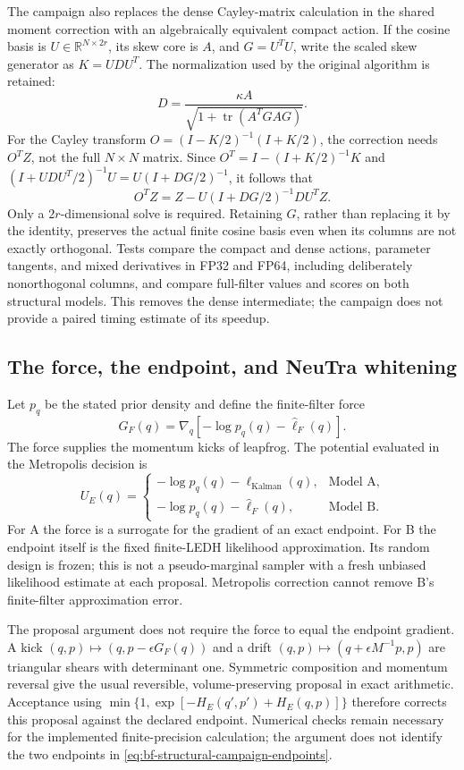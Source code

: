 The campaign also replaces the dense Cayley-matrix calculation in the shared
moment correction with an algebraically equivalent compact action.  If the
cosine basis is $U\in\mathbb R^{N\times2r}$, its skew core is $A$, and
$G=U^TU$, write the scaled skew generator as $K=UDU^T$.  The normalization
used by the original algorithm is retained:
\[
 D=\frac{\kappa A}{\sqrt{1+\operatorname{tr}(A^T G A G)}}.
\]
For the Cayley transform $O=(I-K/2)^{-1}(I+K/2)$, the correction needs
$O^TZ$, not the full $N\times N$ matrix.  Since
$O^T=I-(I+K/2)^{-1}K$ and
$(I+UDU^T/2)^{-1}U=U(I+DG/2)^{-1}$, it follows that
\[
 O^TZ=Z-U(I+DG/2)^{-1}DU^TZ.
\]
Only a $2r$-dimensional solve is required.  Retaining $G$, rather than
replacing it by the identity, preserves the actual finite cosine basis even
when its columns are not exactly orthogonal.  Tests compare the compact and
dense actions, parameter tangents, and mixed derivatives in FP32 and FP64,
including deliberately nonorthogonal columns, and compare full-filter values
and scores on both structural models.  This removes the dense intermediate;
the campaign does not provide a paired timing estimate of its speedup.

\subsection{The force, the endpoint, and NeuTra whitening}

Let $p_q$ be the stated prior density and define the finite-filter force
\[
 G_F(q)=\nabla_q[-\log p_q(q)-\widehat\ell_F(q)].
\]
The force supplies the momentum kicks of leapfrog.  The potential evaluated
in the Metropolis decision is
\begin{equation}
 U_E(q)=
 \begin{cases}
 -\log p_q(q)-\ell_{\mathrm{Kalman}}(q),&\text{Model A},\\
 -\log p_q(q)-\widehat\ell_F(q),&\text{Model B}.
 \end{cases}
 \label{eq:bf-structural-campaign-endpoints}
\end{equation}
For A the force is a surrogate for the gradient of an exact endpoint.  For B
the endpoint itself is the fixed finite-LEDH likelihood approximation.  Its
random design is frozen; this is not a pseudo-marginal sampler with a fresh
unbiased likelihood estimate at each proposal.  Metropolis correction cannot
remove B's finite-filter approximation error.

The proposal argument does not require the force to equal the endpoint
gradient.  A kick $(q,p)\mapsto(q,p-\epsilon G_F(q))$ and a drift
$(q,p)\mapsto(q+\epsilon M^{-1}p,p)$ are triangular shears with determinant
one.  Symmetric composition and momentum reversal give the usual reversible,
volume-preserving proposal in exact arithmetic.  Acceptance using
$\min\{1,\exp[-H_E(q',p')+H_E(q,p)]\}$ therefore corrects this proposal
against the declared endpoint.  Numerical checks remain necessary for the
implemented finite-precision calculation; the argument does not identify
the two endpoints in \eqref{eq:bf-structural-campaign-endpoints}.

